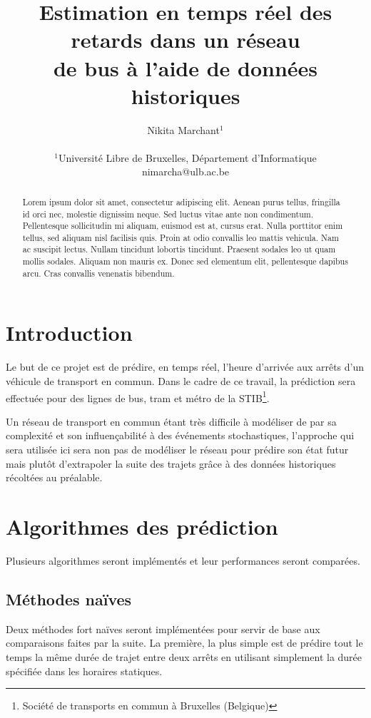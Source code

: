 \documentclass[letterpaper]{article}
\title{Estimation en temps réel des retards dans un réseau\\ de bus à l'aide de données historiques}
\author{Nikita Marchant$^{1}$\\
\mbox{}\\
$^1$Université Libre de Bruxelles, Département d'Informatique\\
nimarcha@ulb.ac.be}
\begin{document}
\maketitle

\begin{abstract}
Lorem ipsum dolor sit amet, consectetur adipiscing elit. Aenean purus tellus, fringilla id orci nec, molestie dignissim neque. Sed luctus vitae ante non condimentum. Pellentesque sollicitudin mi aliquam, euismod est at, cursus erat. Nulla porttitor enim tellus, sed aliquam nisl facilisis quis. Proin at odio convallis leo mattis vehicula. Nam ac suscipit lectus. Nullam tincidunt lobortis tincidunt. Praesent sodales leo ut quam mollis sodales. Aliquam non mauris ex. Donec sed elementum elit, pellentesque dapibus arcu. Cras convallis venenatis bibendum.
\end{abstract}

\section{Introduction}

Le but de ce projet est de prédire, en temps réel, l'heure d'arrivée aux arrêts d'un véhicule de transport en commun. Dans le cadre de ce travail, la prédiction sera effectuée pour des lignes de bus, tram et métro de la STIB\footnote{Société de transports en commun à Bruxelles (Belgique)}.

Un réseau de transport en commun étant très difficile à modéliser de par sa complexité et son influençabilité à des événements stochastiques, l'approche qui sera utilisée ici sera non pas de modéliser le réseau pour prédire son état futur mais plutôt d'extrapoler la suite des trajets grâce à des données historiques récoltées au préalable.

\section{Algorithmes des prédiction}
Plusieurs algorithmes seront implémentés et leur performances seront comparées.

\subsection{Méthodes naïves}
Deux méthodes fort naïves seront implémentées pour servir de base aux comparaisons faites par la suite. La première, la plus simple est de prédire tout le temps la même durée de trajet entre deux arrêts en utilisant simplement la durée spécifiée dans les horaires statiques.
\end{document}
